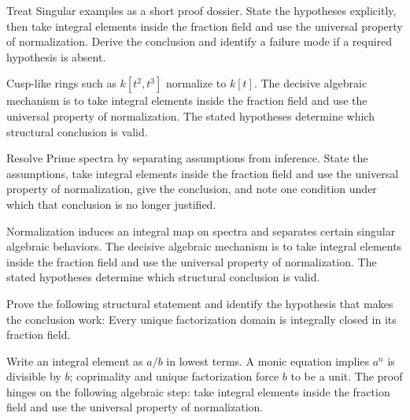 \begin{problem}\label{prob:v20-problem-07}
Treat Singular examples as a short proof dossier. State the hypotheses explicitly, then take integral elements inside the fraction field and use the universal property of normalization. Derive the conclusion and identify a failure mode if a required hypothesis is absent.
\end{problem}
\begin{solution}
Cusp-like rings such as $k[t^2,t^3]$ normalize to $k[t]$. The decisive algebraic mechanism is to take integral elements inside the fraction field and use the universal property of normalization. The stated hypotheses determine which structural conclusion is valid.
\end{solution}

\begin{problem}\label{prob:v20-problem-08}
Resolve Prime spectra by separating assumptions from inference. State the assumptions, take integral elements inside the fraction field and use the universal property of normalization, give the conclusion, and note one condition under which that conclusion is no longer justified.
\end{problem}
\begin{solution}
Normalization induces an integral map on spectra and separates certain singular algebraic behaviors. The decisive algebraic mechanism is to take integral elements inside the fraction field and use the universal property of normalization. The stated hypotheses determine which structural conclusion is valid.
\end{solution}

\begin{problem}\label{prob:v20-problem-09}
Prove the following structural statement and identify the hypothesis that makes the conclusion work: Every unique factorization domain is integrally closed in its fraction field.
\end{problem}
\begin{solution}
Write an integral element as $a/b$ in lowest terms. A monic equation implies $a^n$ is divisible by $b$; coprimality and unique factorization force $b$ to be a unit. The proof hinges on the following algebraic step: take integral elements inside the fraction field and use the universal property of normalization.
\end{solution}

